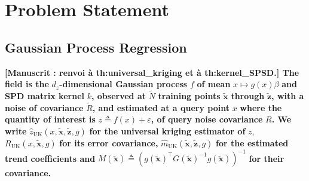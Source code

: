\documentclass[preprint]{elsarticle}
\begin{document}

\section{Problem Statement}\label{sec:problem_statement}

\subsection{Gaussian Process Regression}\label{sec:gaussian_process_regression}

\textbf{[Manuscrit : renvoi à th:universal\_kriging et à th:kernel\_SPSD.] The field is the} $d_z$\textbf{-dimensional Gaussian process} $f$ \textbf{of mean} $x\mapsto g(x)\beta$ \textbf{and SPD matrix kernel} $k$\textbf{, observed at} $\tilde{N}$ \textbf{training points} $\tilde{\mathbf{x}}$ \textbf{through} $\tilde{\mathbf{z}}$\textbf{, with a noise of covariance} $\tilde{R}$\textbf{, and estimated at a query point} $x$ \textbf{where the quantity of interest is} $z\triangleq f(x)+\varepsilon$\textbf{, of query noise covariance} $R$\textbf{. We write} $\hat{z}_{\mathrm{UK}}(x,\tilde{\mathbf{x}},\tilde{\mathbf{z}},g)$ \textbf{for the universal kriging estimator of} $z$, $R_{\mathrm{UK}}(x,\tilde{\mathbf{x}},g)$ \textbf{for its error covariance,} $\hat{m}_{\mathrm{UK}}(\tilde{\mathbf{x}},\tilde{\mathbf{z}},g)$ \textbf{for the estimated trend coefficients and} $M(\tilde{\mathbf{x}})\triangleq\left(g(\tilde{\mathbf{x}})^\top G(\tilde{\mathbf{x}})^{-1}g(\tilde{\mathbf{x}})\right)^{-1}$ \textbf{for their covariance.}
\end{document}
